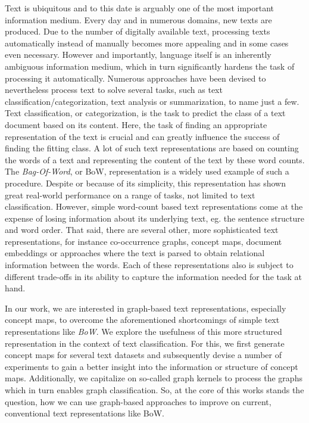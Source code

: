 Text is ubiquitous and to this date is arguably one of the most important information medium.
Every day and in numerous domains, new texts are produced.
Due to the number of digitally available text, processing texts automatically instead of manually becomes more appealing and in some cases even necessary.
However and importantly, language itself is an inherently ambiguous information medium, which in turn significantly hardens the task of processing it automatically.
Numerous approaches have been devised to nevertheless process text to solve several tasks, such as text classification/categorization, text analysis or summarization, to name just a few.
Text classification, or categorization, is the task to predict the class of a text document based on its content.
Here, the task of finding an appropriate representation of the text is crucial and can greatly influence the success of finding the fitting class.
A lot of such text representations are based on counting the words of a text and representing the content of the text by these word counts.
The \textit{Bag-Of-Word}, or BoW, representation is a widely used example of such a procedure.
Despite or because of its simplicity, this representation has shown great real-world performance on a range of tasks, not limited to text classification.
However, simple word-count based text representations come at the expense of losing information about its underlying text, eg. the sentence structure and word order.
That said, there are several other, more sophisticated text representations, for instance 
 co-occurrence graphs, concept maps, document embeddings or approaches where the text is parsed to obtain relational information between the words.
Each of these representations also is subject to different trade-offs in its ability to capture the information needed for the task at hand.

In our work, we are interested in graph-based text representations, especially concept maps, to overcome the aforementioned shortcomings of simple text representations like \textit{BoW}.
We explore the usefulness of this more structured representation in the context of text classification.
For this, we first generate concept maps for several text datasets and subsequently devise a number of experiments to gain a better insight into the information or structure of concept maps.
Additionally, we capitalize on so-called graph kernels to process the graphs which in turn enables graph classification.
So, at the core of this works stands the question, how we can use graph-based approaches to improve on current, conventional text representations like BoW.

